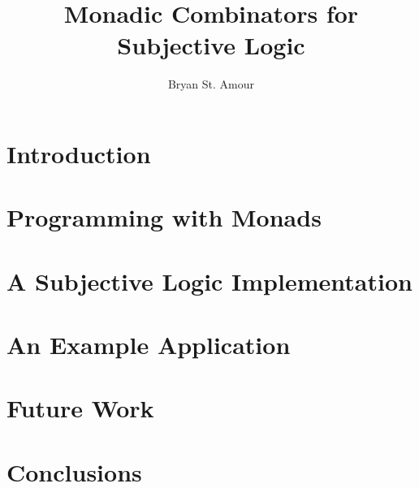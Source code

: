 \documentclass[a4paper]{article}
\title{Monadic Combinators for Subjective Logic}
\author{Bryan St. Amour}
\begin{document}
\maketitle





\section{Introduction}


\section{Programming with Monads}



\section{A Subjective Logic Implementation}


\section{An Example Application}


\section{Future Work}


\section{Conclusions}
\end{document}
